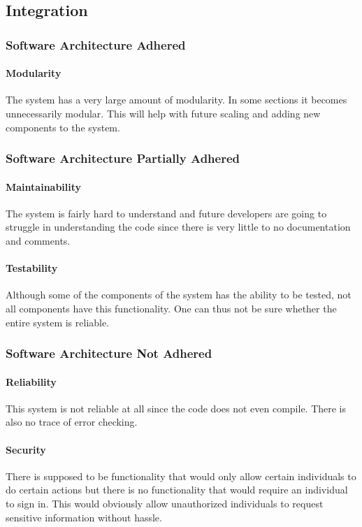 \documentclass{article}
\begin{document}
    \subsection{Integration}
        \subsubsection{Software Architecture Adhered}
            \paragraph{Modularity} The system has a very large amount of modularity. In some sections it becomes unnecessarily modular. This will help with future scaling and adding new components to the system.
            
        \subsubsection{Software Architecture Partially Adhered}
            \paragraph{Maintainability} The system is fairly hard to understand and future developers are going to struggle in understanding the code since there is very little to no documentation and comments.
            \paragraph{Testability} Although some of the components of the system has the ability to be tested, not all components have this functionality. One can thus not be sure whether the entire system is reliable.         
            
        \subsubsection{Software Architecture Not Adhered}
            \paragraph{Reliability} This system is not reliable at all since the code does not even compile. There is also no trace of error checking.
            \paragraph{Security} There is supposed to be functionality that would only allow certain individuals to do certain actions but there is no functionality that would require an individual to sign in. This would obviously allow unauthorized individuals to request sensitive information without hassle.
\end{document}

